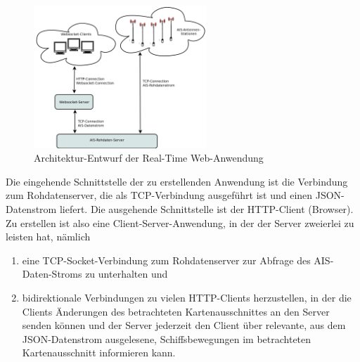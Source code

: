 \begin{figure}
  \begin{center}
    \includegraphics[width=0.58\textwidth]{images/Exposee_graphik_Realtimeapp}
  \end{center}
  \caption{Architektur-Entwurf der Real-Time Web-Anwendung}
\end{figure}
Die eingehende Schnittstelle der zu erstellenden Anwendung ist die Verbindung zum Rohdatenserver, die als TCP-Verbindung ausgeführt ist und einen JSON-Datenstrom liefert.
Die ausgehende Schnittstelle ist der HTTP-Client (Browser).
Zu erstellen ist also eine Client-Server-Anwendung, in der der Server zweierlei zu leisten hat, nämlich 
\begin{enumerate}
 \item eine TCP-Socket-Verbindung zum Rohdatenserver zur Abfrage des AIS-Daten-Stroms zu unterhalten und
  \item bidirektionale Verbindungen zu vielen HTTP-Clients herzustellen, in der die Clients Änderungen des betrachteten Kartenausschnittes an den Server senden können und der Server jederzeit den Client über relevante, aus dem JSON-Datenstrom ausgelesene, Schiffsbewegungen im betrachteten Kartenausschnitt informieren kann.
\end{enumerate}








